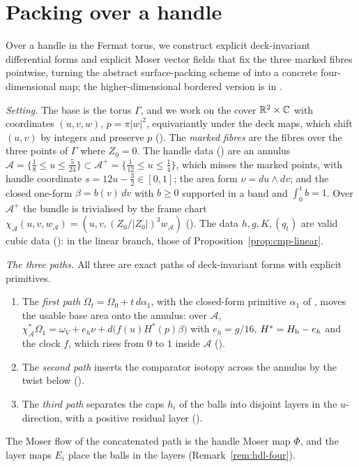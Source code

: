 \section{Packing over a handle}\label{sec:hdl}

Over a handle in the Fermat torus, we construct explicit deck-invariant differential forms and explicit Moser vector
fields \cite{Moser1965} that fix the three marked fibres pointwise, turning the abstract surface-packing scheme of
\cite[\S3.2]{OpenAI2026} into a concrete four-dimensional map; the higher-dimensional bordered version is in
\cite{SongHD}.

\emph{Setting.} The base is the torus $\Gamma$, and we work on the cover $\mathbb{R}^2\times\mathbb{C}$ with coordinates $(u,v,w)$,
$p=\pi|w|^2$, equivariantly under the deck maps, which shift $(u,v)$ by integers and preserve $p$
(). The \emph{marked fibres} are the fibres over the three points of $\Gamma$ where
$Z_0=0$. The handle data () are an annulus
$\mathcal A=\{\frac18\le u\le\frac5{24}\}\subset\mathcal A^+=\{\frac1{12}\le u\le\frac14\}$, which misses the marked
points, with handle coordinate $s=12u-\frac32\in[0,1]$; the area form $\nu=du\wedge dv$; and the closed one-form
$\beta=b(v)\,dv$ with $b\ge0$ supported in a band and $\int_0^1b=1$. Over $\mathcal A^+$ the bundle is trivialised by the
frame chart $\chi_{\mathcal A}(u,v,w_{\mathcal A})=(u,v,(Z_0/|Z_0|)^3w_{\mathcal A})$ ().
The data $h,g,K,(q_t)$ are valid cubic data (): in the linear branch, those of
Proposition~\ref{prop:cmp-linear}.

\emph{The three paths.} All three are exact paths of deck-invariant forms with explicit primitives.
\begin{enumerate}[label=(\arabic*)]
\item The \emph{first path} $\Omega_t=\Omega_0+t\,d\alpha_1$, with the closed-form primitive $\alpha_1$ of
 , moves the usable base area onto the annulus: over $\mathcal A$,
 $\chi_{\mathcal A}^*\Omega_1=\omega_V+e_h\nu+d\bigl(f(u)H^*(p)\beta\bigr)$ with $e_h=g/16$, $H^*=H_{\mathrm b}-e_h$ and the clock
 $f$, which rises from $0$ to $1$ inside $\mathcal A$ ().
\item The \emph{second path} inserts the comparator isotopy across the annulus by the twist below
 ().
\item The \emph{third path} separates the caps $h_i$ of the balls into disjoint layers in the $u$-direction, with a
 positive residual layer ().
\end{enumerate}
The Moser flow of the concatenated path is the handle Moser map $\Phi$, and the layer maps $E_i$ place the balls in
the layers (Remark~\ref{rem:hdl-four}).

